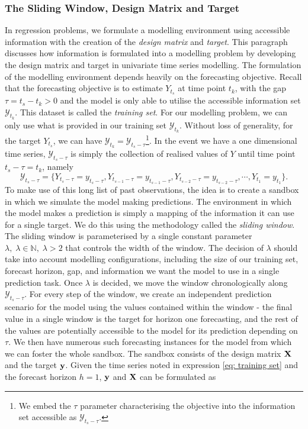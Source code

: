 \subsubsection{The Sliding Window, Design Matrix and Target}
In regression problems, we formulate a modelling environment using accessible information with the creation of the \textit{design matrix} and \textit{target}. This paragraph discusses how information is formulated into a modelling problem by developing the design matrix and target in univariate time series modelling. The formulation of the modelling environment depends heavily on the forecasting objective. Recall that the forecasting objective is to estimate $Y_{t_s}$ at time point $t_k$, with the gap $\tau = t_s - t_k > 0$ and the model is only able to utilise the accessible information set $\mathcal{Y}_{t_k}$. This dataset is called the \textit{training set}. For our modelling problem, we can only use what is provided in our training set $\mathcal{Y}_{t_k}$. Without loss of generality, for the target $Y_{t_s}$, we can have $\mathcal{Y}_{t_k} = \mathcal{Y}_{{t_s}-\tau}$\footnote{We embed the $\tau$ parameter characterising the objective into the information set accessible as $\mathcal{Y}_{t_s - \tau}$.}. In the event we have a one dimensional time series, $\mathcal{Y}_{t_s-\tau}$ is simply the collection of realised values of $Y$ until time point $t_s-\tau = t_k$, namely
\begin{equation}\label{eq: training set}
    \mathcal{Y}_{t_s-\tau} = \{ Y_{t_s-\tau} = y_{t_s-\tau}, Y_{t_{s-1}-\tau} = y_{t_{s-1}-\tau}, Y_{t_{s-2}-\tau} = y_{t_{s-2}-\tau}, \cdots, Y_{t_1} = y_{t_1} \}.
\end{equation}
To make use of this long list of past observations, the idea is to create a sandbox in which we simulate the model making predictions. The environment in which the model makes a prediction is simply a mapping of the information it can use for a single target. We do this using the methodology called the \textit{sliding window}. The sliding window is parameterised by a single constant parameter $\lambda, \; \lambda \in \mathbb{N}, \; \lambda > 2$ that controls the width of the window. The decision of $\lambda$ should take into account modelling configurations, including the size of our training set, forecast horizon, gap, and information we want the model to use in a single prediction task. Once $\lambda$ is decided, we move the window chronologically along $\mathcal{Y}_{t_s -\tau}$. For every step of the window, we create an independent prediction scenario for the model using the values contained within the window - the final value in a single window is the target for horizon one forecasting, and the rest of the values are potentially accessible to the model for its prediction depending on $\tau$. We then have numerous such forecasting instances for the model from which we can foster the whole sandbox. The sandbox consists of the design matrix $\mathbf{X}$ and the target $\mathbf{y}$. Given the time series noted in expression \ref{eq: training set} and the forecast horizon $h=1$, $\mathbf{y}$ and $\mathbf{X}$ can be formulated as
